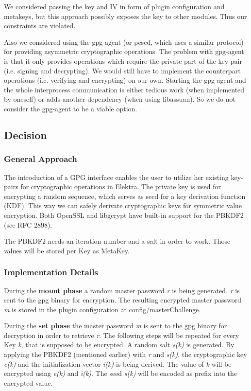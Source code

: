 We considered passing the key and IV in form of plugin configuration and metakeys, but this approach possibly exposes the key to other modules. Thus our constraints are violated.

Also we considered using the gpg-\/agent (or pcscd, which uses a similar protocol) for providing asymmetric cryptographic operations. The problem with gpg-\/agent is that it only provides operations which require the private part of the key-\/pair (i.\+e. signing and decrypting). We would still have to implement the counterpart operations (i.\+e. verifying and encrypting) on our own. Starting the gpg-\/agent and the whole interprocess communication is either tedious work (when implemented by oneself) or adds another dependency (when using libassuan). So we do not consider the gpg-\/agent to be a viable option.

\subsection*{Decision}

\subsubsection*{General Approach}

The introduction of a G\+PG interface enables the user to utilize her existing key-\/pairs for cryptographic operations in Elektra. The private key is used for encrypting a random sequence, which serves as seed for a key derivation function (K\+DF). This way we can safely derivate cryptographic keys for symmetric value encryption. Both Open\+S\+SL and libgcrypt have built-\/in support for the P\+B\+K\+D\+F2 (see R\+FC 2898).

The P\+B\+K\+D\+F2 needs an iteration number and a salt in order to work. Those values will be stored per Key as Meta\+Key.

\subsubsection*{Implementation Details}

During the {\bfseries mount phase} a random master password {\itshape r} is being generated. {\itshape r} is sent to the gpg binary for encryption. The resulting encrypted master password {\itshape m} is stored in the plugin configuration at {\ttfamily config/master\+Challenge}.

During the {\bfseries set phase} the master password {\itshape m} is sent to the gpg binary for decryption in order to retrieve {\itshape r}. The following steps will be repeated for every Key {\itshape k}, that is supposed to be encrypted. A random salt {\itshape s(k)} is generated. By applying the P\+B\+K\+D\+F2 (mentioned earlier) with {\itshape r} and {\itshape s(k)}, the cryptographic key {\itshape e(k)} and the initialization vector {\itshape i(k)} is being derived. The value of {\itshape k} will be encrypted using {\itshape e(k)} and {\itshape i(k)}. The seed {\itshape s(k)} will be encoded as prefix into the encrypted value.

